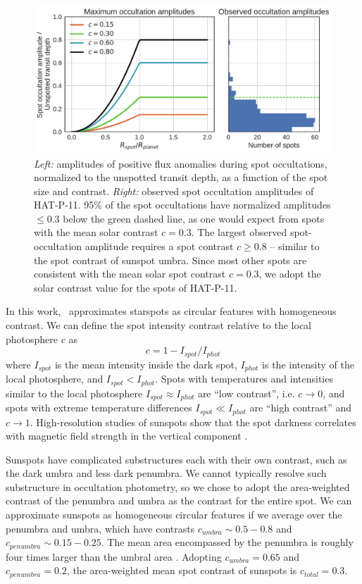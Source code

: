 \begin{figure}
\centering
\includegraphics[scale=0.5]{stsp_hat_p_11/contrasts.pdf}
\caption{\textit{Left:} amplitudes of positive flux anomalies during spot occultations, normalized to the unspotted transit depth, as a function of the spot size and contrast. \textit{Right:} observed spot occultation amplitudes of HAT-P-11. 95\% of the spot occultations have normalized amplitudes $\le 0.3$ below the green dashed line, as one would expect from spots with the mean solar contrast $c=0.3$. The largest observed spot-occultation amplitude requires a spot contrast $c \ge 0.8$ -- similar to the spot contrast of sunspot umbra. Since most other spots are consistent with the mean solar spot contrast $c = 0.3$, we adopt the solar contrast value for the spots of HAT-P-11.}
\label{fig:contrast}
\end{figure}

In this work, \stsp\ approximates starspots as circular features with homogeneous contrast. We can define the spot intensity contrast relative to the local photosphere $c$ as
\begin{equation}
c = 1 - I_{spot}/I_{phot} \label{eqn:contrast}
\end{equation}
where $I_{spot}$ is the mean intensity inside the dark spot, $I_{phot}$ is the intensity of the local photosphere, and $I_{spot} < I_{phot}$. Spots with temperatures and intensities similar to the local photosphere $I_{spot} \approx I_{phot}$ are ``low contrast'', i.e. $c \rightarrow 0$, and spots with extreme temperature differences $I_{spot} \ll I_{phot}$ are ``high contrast'' and $c\rightarrow 1$. High-resolution studies of sunspots show that the spot darkness correlates with magnetic field strength in the vertical component \citep{Keppens1996, Leonard2008}.

Sunspots have complicated substructures each with their own contrast, such as the dark umbra and less dark penumbra. We cannot typically resolve such substructure in occultation photometry, so we chose to adopt the area-weighted contrast of the penumbra and umbra as the contrast for the entire spot. We can approximate sunspots as homogeneous circular features if we average over the penumbra and umbra, which have contrasts $c_{umbra} \sim 0.5 - 0.8$ and $c_{penumbra} \sim 0.15-0.25$. The mean area encompassed by the penumbra is roughly four times larger than the umbral area \citep{Solanki2003}. Adopting $c_{umbra} = 0.65$ and $c_{penumbra} = 0.2$, the area-weighted mean spot contrast of sunspots is $c_{total} = 0.3$. 

